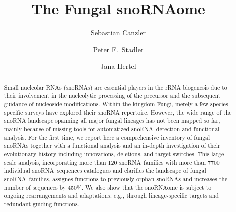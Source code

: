 \documentclass[preprint,3p,times,twocolumn]{elsarticle}
\newcommand{\NEW}[1]{\begingroup\color{blue}#1\endgroup}
\newcommand{\sno}{snoRNA}
\begin{document}
\begin{frontmatter}

\title{The Fungal snoRNAome}

\author[LEI]{Sebastian Canzler}
\author[LEI,IZBI,MPI,IZI,RTH,TBI,SFI]{Peter F.\ Stadler}
\author[UFZ]{Jana Hertel}

\address[LEI]{Bioinformatics Group, Department of Computer Science,
  Leipzig University,
  H{\"a}rtelstra{\ss}e 16-18, D-04107 Leipzig, Germany
}
\address[IZBI]{Interdisciplinary Center for Bioinformatics,
  German Centre for Integrative Biodiversity Research (iDiv)
  Halle-Jena-Leipzig, Competence Center for Scalable Data Services
  and Solutions, and Leipzig Research Center for Civilization Diseases,
  Leipzig University
}
\address[UFZ]{Young Investigators Group Bioinformatics and Transcriptomics, 
  Department Proteomics, 
  Helmholtz Centre for Environmental Research -- UFZ, 
  Permoserstra{\ss}e 15,
  D-04318 Leipzig, Germany
}
\address[IZI]{Department of Diagnostics, 
  Fraunhofer Institute for Cell Therapy and Immunology -- IZI,
  Perlickstra{\ss}e 1, 
  D-04103 Leipzig, Germany
}
\address[MPI]{Max Planck Institute for Mathematics in the Sciences,
  Inselstra{\ss}e 22, D-04103 Leipzig, Germany
}
\address[TBI]{Department of Theoretical Chemistry,
  University of Vienna,
  W{\"a}hringerstra{\ss}e 17, A-1090 Wien, Austria
}
\address[RTH]{Center for non-coding RNA in Technology and Health,
  University of Copenhagen, Gr{\o}nneg{\aa}rdsvej 3, 
  DK-1870 Frederiksberg C, Denmark
}
\address[SFI]{Santa Fe Institute, 1399 Hyde Park Rd., Santa Fe, NM 87501,
  USA\\[1em]
}




\begin{abstract}
  Small nucleolar RNAs (snoRNAs) are essential players in the rRNA
  biogenesis due to their involvement in the nucleolytic processing of
  the precursor and the subsequent guidance of nucleoside
  modifications. Within the kingdom Fungi, merely a few species-specific
  surveys have explored their snoRNA repertoire. However, the wide
  range of the snoRNA landscape spanning all major fungal lineages has
  not been mapped so far, mainly because of missing tools for
  automatized \sno\ detection and functional analysis. For the first
  time, we report here a comprehensive inventory of fungal \sno s together
  with a functional analysis and an in-depth investigation of their
  evolutionary history including innovations, deletions, and target
  switches. This large-scale analysis, incorporating more than 120
  \sno\ families with more than 7700 individual \sno\ sequences
  \NEW{catalogues and clarifies the landscape of fungal \sno\ families, assignes
    functions to previously orphan \sno s and increases the number of
    sequences by 450\%. We also show} that the \sno ome is subject to
  ongoing rearrangements and adaptations, e.g., through
  lineage-specific targets and redundant guiding functions.


\end{abstract}
\end{frontmatter}
\end{document}
